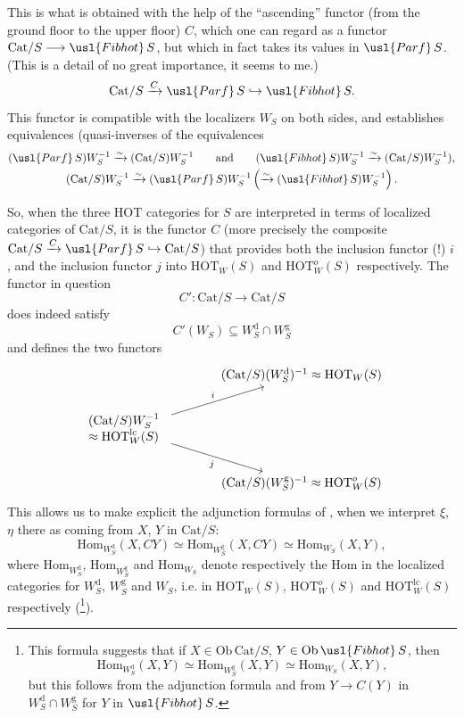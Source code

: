 This is what is obtained with the help of the ``ascending'' functor (from the ground floor to the upper floor) $C$, which one can regard as a functor $\mathrm{Cat}/S \longrightarrow \usl{Fibhot}\,S$, but which in fact takes its values in $\usl{Parf}\,S$. (This is a detail of no great importance, it seems to me.)
\[
\mathrm{Cat}/S \xrightarrow{C} \usl{Parf}\,S \hookrightarrow \usl{Fibhot}\,S.
\]
This functor is compatible with the localizers $W_S$ on both sides, and establishes equivalences (quasi-inverses of the equivalences
\[
\begin{gathered}
(\usl{Parf}\,S)W_S^{-1} \xrightarrow{\sim} (\mathrm{Cat}/S)W_S^{-1} \qquad\text{and}\qquad (\usl{Fibhot}\,S)W_S^{-1} \xrightarrow{\sim} (\mathrm{Cat}/S)W_S^{-1}),\\
(\mathrm{Cat}/S)W_S^{-1} \xrightarrow{\sim} (\usl{Parf}\,S)W_S^{-1} \left( \xrightarrow{\sim} (\usl{Fibhot}\,S)W_S^{-1} \right).
\end{gathered}
\]

So, when the three HOT categories for $S$ are interpreted in terms of localized categories of $\mathrm{Cat}/S$, it is the functor $C$ (more precisely the composite $\mathrm{Cat}/S \xrightarrow{C} \usl{Parf}\,S \hookrightarrow \mathrm{Cat}/S$) that provides both the inclusion functor (!) $i$, and the inclusion functor $j$ into $\mathrm{HOT}_W(S)$ and $\mathrm{HOT}^{o}_{W}(S)$ respectively. The functor in question
\[
C' : \mathrm{Cat}/S \longrightarrow \mathrm{Cat}/S
\]
does indeed satisfy
\[
C'(W_S) \subseteq W_S^{\mathrm{d}} \cap W_S^{\mathrm{g}}
\]
and defines the two functors
\[
\begin{tikzcd}[column sep=large]
& (\mathrm{Cat}/S)(W_S^{\mathrm{d}})^{-1} \approx \mathrm{HOT}_W(S) \\
\begin{array}{l} (\mathrm{Cat}/S)W_S^{-1} \\ \approx \mathrm{HOT}^{\mathrm{lc}}_{W}(S) \end{array} \arrow[ur, "i"] \arrow[dr, "j"'] & \\
& (\mathrm{Cat}/S)(W_S^{\mathrm{g}})^{-1} \approx \mathrm{HOT}^{o}_{W}(S)
\end{tikzcd}
\]
This allows us to make explicit the adjunction formulas of , when we interpret $\xi$, $\eta$ there
as coming from $X$, $Y$ in $\mathrm{Cat}/S$:
\[
\boxed{\mathrm{Hom}_{W_S^{\mathrm{d}}}(X,CY) \simeq \mathrm{Hom}_{W_S^{\mathrm{g}}}(X,CY) \simeq \mathrm{Hom}_{W_S}(X,Y),}
\]
where $\mathrm{Hom}_{W_S^{\mathrm{d}}}$, $\mathrm{Hom}_{W_S^{\mathrm{g}}}$ and $\mathrm{Hom}_{W_S}$ denote respectively the Hom in the localized categories for $W_S^{\mathrm{d}}$, $W_S^{\mathrm{g}}$ and $W_S$, i.e. in $\mathrm{HOT}_W(S)$, $\mathrm{HOT}^{o}_{W}(S)$ and $\mathrm{HOT}^{\mathrm{lc}}_{W}(S)$ respectively (\footnote[51]{This formula suggests that if $X \in \mathrm{Ob}\,\mathrm{Cat}/S$, $Y \in \mathrm{Ob}\,\usl{Fibhot}\,S$, then
\[
\mathrm{Hom}_{W_S^{\mathrm{d}}}(X,Y) \simeq \mathrm{Hom}_{W_S^{\mathrm{g}}}(X,Y) \simeq \mathrm{Hom}_{W_S}(X,Y),
\]
but this follows from the adjunction formula and from $Y \longrightarrow C(Y)$ in $W_S^{\mathrm{d}} \cap W_S^{\mathrm{g}}$ for $Y$ in $\usl{Fibhot}\,S$.}). %

